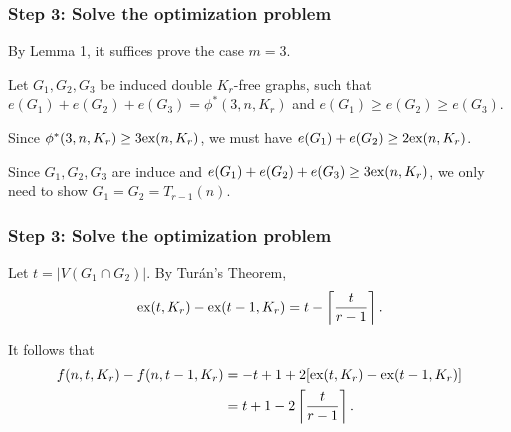 \documentclass{beamer}
\newcommand*{\ex}{\textnormal{ex}}
\begin{document}
\begin{frame}
  \frametitle{Step 3: Solve the optimization problem}

  By Lemma 1, it suffices prove the case $m = 3$. 

  \pause

  \vspace{0.6cm}

  Let $G_1, G_2, G_3$ be induced double $K_r$-free graphs, such that $e(G_1) + e(G_2) + e(G_3) = \phi^*(3, n, K_r)$ and $e(G_1) \geq e(G_2) \geq e(G_3)$.

  \pause

  \vspace{0.6cm}

  Since $\phi^*(3, n, K_r) \geq 3\ex(n, K_r)$, we must have $e(G_1) + e(G_2) \geq 2\ex(n, K_r)$.

  \pause

  \vspace{0.6cm}

  Since $G_1, G_2, G_3$ are induce and $e(G_1) + e(G_2) + e(G_3) \geq 3\ex(n, K_r)$, we only need to show $G_1 = G_2 = T_{r - 1}(n)$.
\end{frame}

\begin{frame}
  \frametitle{Step 3: Solve the optimization problem}

  Let $t = |V(G_1 \cap G_2)|$. By Turán's Theorem,
  \[
    \ex(t, K_{r}) - \ex(t - 1, K_{r}) = t - \left\lceil \frac{t}{r - 1} \right\rceil.
  \]

  \pause

  \vspace{0.5cm}

  It follows that
  \begin{align}
    f(n, t, K_r) - f(n, t - 1, K_r)
    &= - t + 1 + 2[\ex(t, K_r) - \ex(t - 1, K_r)] \notag \\
    &= t + 1 - 2\left\lceil \frac{t}{r - 1} \right\rceil. 
  \end{align}
\end{frame}
\end{document}
